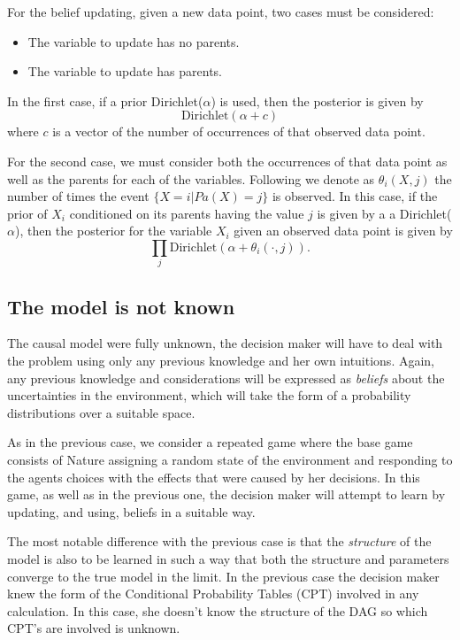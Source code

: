 \documentclass{article}
\begin{document}
For the belief updating, given a new data point,  two cases must be considered:
\begin{itemize}
\item The variable to update has no parents.
\item The variable to update has parents.
\end{itemize}

In the first case, if a prior Dirichlet($\alpha$) is used, then the posterior is given by
\[ \textrm{Dirichlet}(\alpha + c) \]
where $c$ is a vector of the number of occurrences of that observed data point. 

For the second case, we must consider both the occurrences of that data point as well as the parents for each of the variables. Following \cite{barber2012bayesian} we denote as $\theta_i(X,j)$ the number of times the event $\{X=i | Pa(X)=j\}$ is observed. In this case, if the prior of $X_i$ conditioned on its parents having the value $j$ is given by a a Dirichlet($\alpha$), then the posterior for the variable $X_i$ given an observed data point is given by 
\[ \prod_j \textrm{Dirichlet}(\alpha + \theta_i(\cdot,j)). \]

\subsection{The model is not known}
The causal model were fully unknown, the decision maker will have to deal with the problem using only any previous knowledge and her own intuitions. Again, any previous knowledge and considerations will be expressed as \textit{beliefs} about the uncertainties in the environment, which will take the form of a probability distributions over a suitable space. 

As in the previous case, we consider a repeated game where the base game consists of Nature assigning a random state of the environment and responding to the agents choices with the effects that were caused by her decisions. In this game, as well as in the previous one, the decision maker will attempt to learn by updating, and using, beliefs in a suitable way. 

The most notable difference with the previous case is that the \textit{structure} of the model is also to be learned in such a way that both the structure and parameters converge to the true model in the limit. In the previous case the decision maker knew the form of the Conditional Probability Tables (CPT) involved in any calculation. In this case, she doesn't know the structure of the DAG so which CPT's are involved is unknown.
\end{document}
